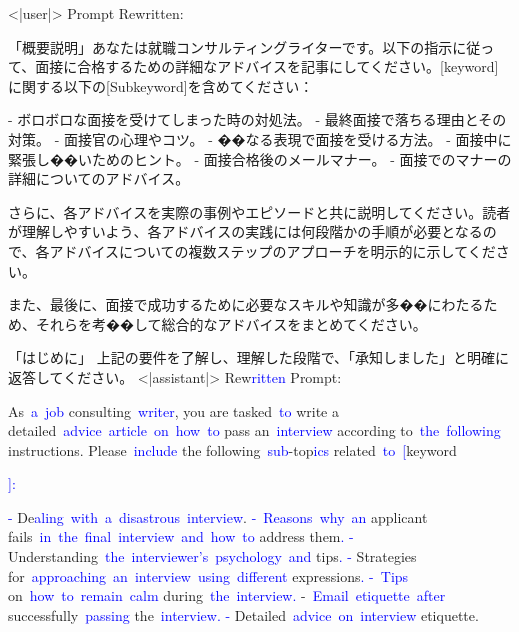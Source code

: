 \documentclass{article}
\begin{document}
\begin{tcolorbox}[colframe=black,colback=white]
<|user|>
Prompt Rewritten:

「概要説明」あなたは就職コンサルティングライターです。以下の指示に従って、面接に合格するための詳細なアドバイスを記事にしてください。[keyword]に関する以下の[Subkeyword]を含めてください：

- ボロボロな面接を受けてしまった時の対処法。
- 最終面接で落ちる理由とその対策。
- 面接官の心理やコツ。
- ��なる表現で面接を受ける方法。
- 面接中に緊張し��いためのヒント。
- 面接合格後のメールマナー。
- 面接でのマナーの詳細についてのアドバイス。

さらに、各アドバイスを実際の事例やエピソードと共に説明してください。読者が理解しやすいよう、各アドバイスの実践には何段階かの手順が必要となるので、各アドバイスについての複数ステップのアプローチを明示的に示してください。

また、最後に、面接で成功するために必要なスキルや知識が多��にわたるため、それらを考��して総合的なアドバイスをまとめてください。

「はじめに」
上記の要件を了解し、理解した段階で、「承知しました」と明確に返答してください。
<|assistant|>
Rew\textcolor{blue}{ritten} Prompt:

As\textcolor{blue}{~a}\textcolor{blue}{~job} consulting\textcolor{blue}{~writer}, you are tasked\textcolor{blue}{~to} write a detailed\textcolor{blue}{~advice}\textcolor{blue}{~article}\textcolor{blue}{~on}\textcolor{blue}{~how}\textcolor{blue}{~to} pass an\textcolor{blue}{~interview} according to\textcolor{blue}{~the}\textcolor{blue}{~following} instructions. Please\textcolor{blue}{~include} the following\textcolor{blue}{~sub}-top\textcolor{blue}{ics} related\textcolor{blue}{~to}\textcolor{blue}{~[}keyword\textcolor{blue}{]:

}\textcolor{blue}{-} De\textcolor{blue}{aling}\textcolor{blue}{~with}\textcolor{blue}{~a}\textcolor{blue}{~disastrous}\textcolor{blue}{~interview}.
\textcolor{blue}{-}\textcolor{blue}{~Reasons}\textcolor{blue}{~why}\textcolor{blue}{~an} applicant fails\textcolor{blue}{~in}\textcolor{blue}{~the}\textcolor{blue}{~final}\textcolor{blue}{~interview}\textcolor{blue}{~and}\textcolor{blue}{~how}\textcolor{blue}{~to} address them\textcolor{blue}{.
}\textcolor{blue}{-} Understanding\textcolor{blue}{~the}\textcolor{blue}{~interviewer}\textcolor{blue}{'s}\textcolor{blue}{~psychology}\textcolor{blue}{~and} tips\textcolor{blue}{.
}\textcolor{blue}{-} Strategies for\textcolor{blue}{~approaching}\textcolor{blue}{~an}\textcolor{blue}{~interview}\textcolor{blue}{~using}\textcolor{blue}{~different} expressions\textcolor{blue}{.
}\textcolor{blue}{-}\textcolor{blue}{~Tips} on\textcolor{blue}{~how}\textcolor{blue}{~to}\textcolor{blue}{~remain}\textcolor{blue}{~calm} during\textcolor{blue}{~the}\textcolor{blue}{~interview}\textcolor{blue}{.
}-\textcolor{blue}{~Email}\textcolor{blue}{~etiquette}\textcolor{blue}{~after} successfully\textcolor{blue}{~passing} the\textcolor{blue}{~interview}\textcolor{blue}{.
}\textcolor{blue}{-} Detailed\textcolor{blue}{~advice}\textcolor{blue}{~on}\textcolor{blue}{~interview} etiquette.


\end{tcolorbox}
\end{document}
